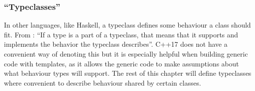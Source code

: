

\subsubsection{``Typeclasses''}
In other languages, like Haskell, a typeclass defines some behaviour a class should fit. From \cite{learnyouahaskell}: ``If a type is a part of a typeclass, that means that it supports and implements the behavior the typeclass describes''.
C++17 does not have a convenient way of denoting this but it is especially helpful when building generic code with templates, as it allows the generic code to make assumptions about what behaviour types will support.
The rest of this chapter will define typeclasses where convenient to describe behaviour shared by certain classes.






